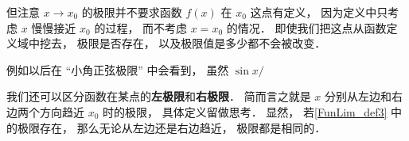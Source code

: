 但注意 $x\to x_0$ 的极限并不要求函数 $f(x)$ 在 $x_0$ 这点有定义， 因为定义中只考虑 $x$ 慢慢接近 $x_0$ 的过程， 而不考虑 $x = x_0$ 的情况． 即使我们把这点从函数定义域中挖去， 极限是否存在， 以及极限值是多少都不会被改变．

例如以后在 “小角正弦极限” 中会看到， 虽然 $\sin x/ $


我们还可以区分函数在某点的\textbf{左极限}和\textbf{右极限}． 简而言之就是 $x$ 分别从左边和右边两个方向趋近 $x_0$ 时的极限， 具体定义留做思考． 显然， 若\autoref{FunLim_def3} 中的极限存在， 那么无论从左边还是右边趋近， 极限都是相同的．